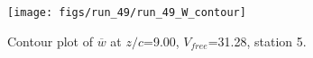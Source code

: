 \begin{figure}[H]
\centering
\texttt{[image: figs/run\_49/run\_49\_W\_contour]}
\caption{Contour plot of $\overline{w}$ at $z/c$=9.00, $V_{free}$=31.28, station 5.}
\end{figure}


